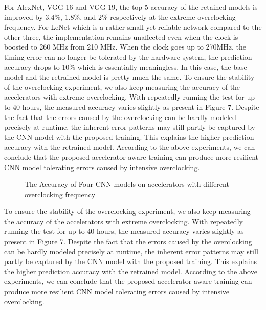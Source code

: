   For AlexNet, VGG-16 and VGG-19, the top-5 accuracy of the retained models is improved by 3.4\%, 1.8\%, and 2\% 
respectively at the extreme overclocking frequency. For LeNet which is a rather small yet reliable network 
compared to the other three, the implementation remains unaffected even when the clock is boosted to 260 MHz 
from 210 MHz. When the clock goes up to 270MHz, the timing error can no longer be tolerated by the hardware system, 
the prediction accuracy drops to 10\% which is essentially meaningless. In this case, the base model 
and the retrained model is pretty much the same. To ensure the stability of the overclocking experiment, 
we also keep measuring the accuracy of the accelerators with extreme overclocking. With repeatedly 
running the test for up to 40 hours, the measured accuracy varies slightly as present in Figure 7. 
Despite the fact that the errors caused by the overclocking can be hardly modeled precisely at runtime, 
the inherent error patterns may still partly be captured by the CNN model with the proposed training. 
This explains the higher prediction accuracy with the retrained model. According to the 
above experiments, we can conclude that the proposed accelerator aware training can produce 
more resilient CNN model tolerating errors caused by intensive overclocking. 

\begin{figure}
        \center
	\qquad
	\qquad
        \qquad
	\caption{The Accuracy of Four CNN models on accelerators with different overclocking frequency}
        \label{fig:overclock accuracy}
\end{figure}

To ensure the stability of the overclocking experiment, we 
also keep measuring the accuracy of the accelerators with extreme 
overclocking. With repeatedly running the test for up to 40 hours, 
the measured accuracy varies slightly as present in Figure 7. 
Despite the fact that the errors caused by the overclocking can be 
hardly modeled precisely at runtime, the inherent error patterns may 
still partly be captured by the CNN model with the proposed training. 
This explains the higher prediction accuracy with the retrained model. 
According to the above experiments, we can conclude that the proposed 
accelerator aware training can produce more resilient CNN model tolerating 
errors caused by intensive overclocking. 

